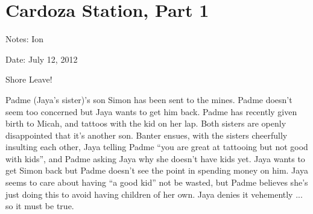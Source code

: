 \setcounter{chapter}{ 2 }
\chapter{\textbf{Cardoza Station, Part 1} }






Notes: Ion

Date: July 12, 2012

\noindent\hrulefill





 {\LARGE Shore Leave! } 



Padme (Jaya's sister)'s son Simon has been sent to the mines.  Padme doesn't seem too concerned but Jaya wants to get him back.  Padme has recently given birth to Micah, and tattoos with the kid on her lap.  Both sisters are openly disappointed that it's another son.  Banter ensues, with the sisters cheerfully insulting each other, Jaya telling Padme ``you are great at tattooing but not good with kids'', and Padme asking Jaya why she doesn't have kids yet.  Jaya wants to get Simon back but Padme doesn't see the point in spending money on him.  Jaya seems to care about having ``a good kid'' not be wasted, but Padme believes she's just doing this to avoid having children of her own.  Jaya denies it vehemently ... so it must be true.



